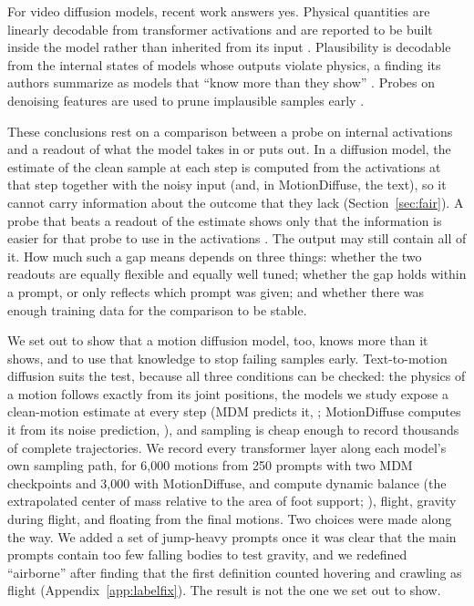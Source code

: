 For video diffusion models, recent work answers yes. Physical quantities are linearly decodable from transformer activations and are reported to be built inside the model rather than inherited from its input \citep{kneifl2026physics}. Plausibility is decodable from the internal states of models whose outputs violate physics, a finding its authors summarize as models that ``know more than they show'' \citep{esmati2026invisible}. Probes on denoising features are used to prune implausible samples early \citep{tang2026seeking}.

These conclusions rest on a comparison between a probe on internal activations and a readout of what the model takes in or puts out. In a diffusion model, the estimate of the clean sample at each step is computed from the activations at that step together with the noisy input (and, in MotionDiffuse, the text), so it cannot carry information about the outcome that they lack (Section~\ref{sec:fair}). A probe that beats a readout of the estimate shows only that the information is easier for that probe to use in the activations \citep{xu2020vinfo}. The output may still contain all of it. How much such a gap means depends on three things: whether the two readouts are equally flexible and equally well tuned; whether the gap holds within a prompt, or only reflects which prompt was given; and whether there was enough training data for the comparison to be stable.

We set out to show that a motion diffusion model, too, knows more than it shows, and to use that knowledge to stop failing samples early. Text-to-motion diffusion suits the test, because all three conditions can be checked: the physics of a motion follows exactly from its joint positions, the models we study expose a clean-motion estimate at every step (MDM predicts it, \citealp{tevet2023mdm}; MotionDiffuse computes it from its noise prediction, \citealp{zhang2022motiondiffuse}), and sampling is cheap enough to record thousands of complete trajectories. We record every transformer layer along each model's own sampling path, for 6,000 motions from 250 prompts with two MDM checkpoints and 3,000 with MotionDiffuse, and compute dynamic balance (the extrapolated center of mass relative to the area of foot support; \citealp{hof2005condition}), flight, gravity during flight, and floating from the final motions. Two choices were made along the way. We added a set of jump-heavy prompts once it was clear that the main prompts contain too few falling bodies to test gravity, and we redefined ``airborne'' after finding that the first definition counted hovering and crawling as flight (Appendix~\ref{app:labelfix}). The result is not the one we set out to show.

